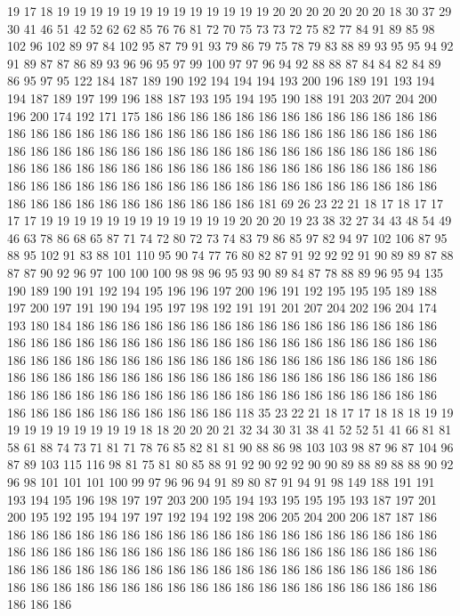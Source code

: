 19 17 18 19 19 19 19 19 19 19 19 19 19 19 19 19 20 20 20 20
20 20 20 18 30 37 29 30 41 46 51 42 52 62 62 85 76 76 81 72
70 75 73 73 72 75 82 77 84 91 89 85 98 102 96 102 89 97 84 102
95 87 79 91 93 79 86 79 75 78 79 83 88 89 93 95 95 94 92 91
89 87 87 86 89 93 96 96 95 97 99 100 97 97 96 94 92 88 88 87
84 84 82 84 89 86 95 97 95 122 184 187 189 190 192 194 194 194 193 200
196 189 191 193 194 194 187 189 197 199 196 188 187 193 195 194 195 190 188 191
203 207 204 200 196 200 174 192 171 175 186 186 186 186 186 186 186 186 186 186
186 186 186 186 186 186 186 186 186 186 186 186 186 186 186 186 186 186 186 186
186 186 186 186 186 186 186 186 186 186 186 186 186 186 186 186 186 186 186 186
186 186 186 186 186 186 186 186 186 186 186 186 186 186 186 186 186 186 186 186
186 186 186 186 186 186 186 186 186 186 186 186 186 186 186 186 186 186 186 186
186 186 186 186 186 186 186 186 186 186 181 69 26 23 22 21 18 17 18 17
17 17 17 19 19 19 19 19 19 19 19 19 19 19 19 20 20 20 19 23
38 32 27 34 43 48 54 49 46 63 78 86 68 65 87 71 74 72 80 72
73 74 83 79 86 85 97 82 94 97 102 106 87 95 88 95 102 91 83 88
101 110 95 90 74 77 76 80 82 87 91 92 92 92 91 90 89 89 87 88
87 87 90 92 96 97 100 100 100 98 98 96 95 93 90 89 84 87 78 88
89 96 95 94 135 190 189 190 191 192 194 195 196 196 197 200 196 191 192 195
195 195 189 188 197 200 197 191 190 194 195 197 198 192 191 191 201 207 204 202
196 204 174 193 180 184 186 186 186 186 186 186 186 186 186 186 186 186 186 186
186 186 186 186 186 186 186 186 186 186 186 186 186 186 186 186 186 186 186 186
186 186 186 186 186 186 186 186 186 186 186 186 186 186 186 186 186 186 186 186
186 186 186 186 186 186 186 186 186 186 186 186 186 186 186 186 186 186 186 186
186 186 186 186 186 186 186 186 186 186 186 186 186 186 186 186 186 186 186 186
186 186 186 186 186 186 186 186 118 35 23 22 21 18 17 17 18 18 18 19
19 19 19 19 19 19 19 19 19 18 18 20 20 20 21 32 34 30 31 38
41 52 52 51 41 66 81 81 58 61 88 74 73 71 81 71 78 76 85 82
81 81 90 88 86 98 103 103 98 87 96 87 104 96 87 89 103 115 116 98
81 75 81 80 85 88 91 92 90 92 92 90 90 89 88 89 88 88 90 92
96 98 101 101 101 100 99 97 96 96 94 91 89 80 87 91 94 91 98 149
188 191 191 193 194 195 196 198 197 197 203 200 195 194 193 195 195 195 193 187
197 201 200 195 192 195 194 197 197 192 194 192 198 206 205 204 200 206 187 187
186 186 186 186 186 186 186 186 186 186 186 186 186 186 186 186 186 186 186 186
186 186 186 186 186 186 186 186 186 186 186 186 186 186 186 186 186 186 186 186
186 186 186 186 186 186 186 186 186 186 186 186 186 186 186 186 186 186 186 186
186 186 186 186 186 186 186 186 186 186 186 186 186 186 186 186 186 186 186 186
